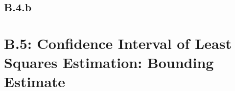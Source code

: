 \documentclass[]{article}
\begin{document}
    \subsection*{B.4.b}
    
\section*{B.5: Confidence Interval of Least Squares Estimation: Bounding Estimate}
\end{document}
